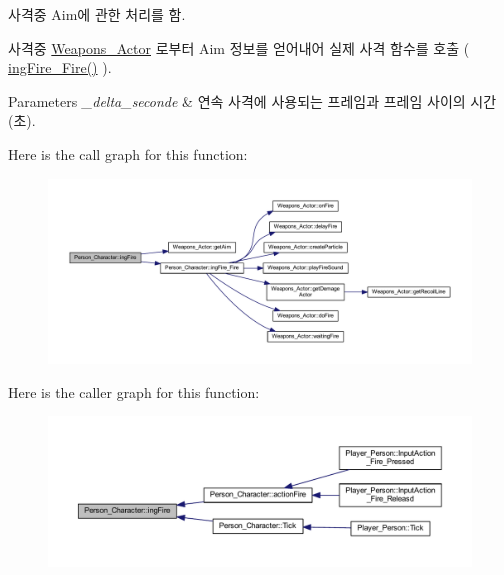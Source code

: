 사격중 Aim에 관한 처리를 함. 

사격중 \hyperlink{class_weapons___actor}{Weapons\+\_\+\+Actor} 로부터 Aim 정보를 얻어내어 실제 사격 함수를 호출 ( \hyperlink{class_person___character_a7d0f5b22056e049f5a46ca0b2abb91ae}{ing\+Fire\+\_\+\+Fire()} ). 
\begin{DoxyParams}{Parameters}
{\em \+\_\+delta\+\_\+seconde} & 연속 사격에 사용되는 프레임과 프레임 사이의 시간(초). \\
\hline
\end{DoxyParams}


Here is the call graph for this function\+:\nopagebreak
\begin{figure}[H]
\begin{center}
\leavevmode
\includegraphics[width=350pt]{class_person___character_ae24a8beecb67858f956a8d163a4d9333_cgraph}
\end{center}
\end{figure}




Here is the caller graph for this function\+:\nopagebreak
\begin{figure}[H]
\begin{center}
\leavevmode
\includegraphics[width=350pt]{class_person___character_ae24a8beecb67858f956a8d163a4d9333_icgraph}
\end{center}
\end{figure}


